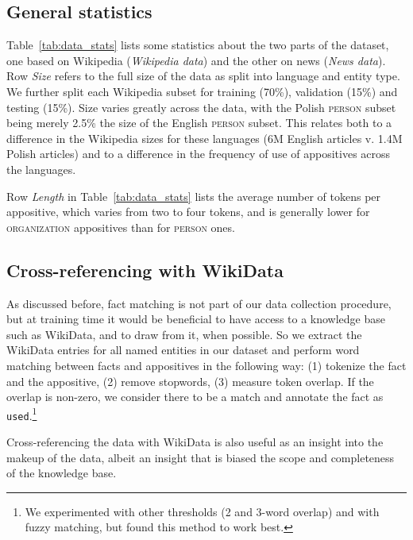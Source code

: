 \documentclass[11pt]{article}
\newcommand{\yktodo}[1]{\todo[color=green!20]{#1}}
\newcommand{\dltodo}[1]{\todo[color=yellow!20]{#1}}
\begin{document}
\subsection{General statistics}
Table~\ref{tab:data_stats} lists some statistics about the two parts of the dataset, one based on Wikipedia (\textit{Wikipedia data}) and the other on news (\textit{News data}). Row \textit{Size} refers to the full size of the data as split into language and entity type. We further split each Wikipedia subset for training (70\%), validation (15\%) and testing (15\%).  
Size varies greatly across the data, with the Polish \textsc{person} subset being merely 2.5\% the size of the English \textsc{person} subset. This relates both to a difference in the Wikipedia sizes for these languages  (6M English articles v. 1.4M Polish articles) and to a difference in the frequency of use of appositives across the languages.  

Row \textit{Length} in Table~\ref{tab:data_stats} lists the average number of tokens per appositive, which varies from two to four tokens, and is generally lower for \textsc{organization} appositives than for \textsc{person} ones. 

\subsection{Cross-referencing with WikiData}

As discussed before, fact matching is not part of our data collection procedure, but at training time it would be beneficial to have access to a knowledge base such as WikiData, and to draw from it, when possible. So we extract the WikiData entries for all named entities in our dataset and perform word matching between facts and appositives in the following way: (1) tokenize the fact and the appositive, (2) remove stopwords, (3) measure token overlap. If the overlap is non-zero, we consider there to be a match and annotate the fact as \texttt{used}.\footnote{We experimented with other thresholds (2 and 3-word overlap) and with fuzzy matching, but found this method to work best.}

Cross-referencing the data with WikiData is also useful as an insight into the makeup of the data, albeit an insight that is biased the scope and completeness of the knowledge base.
\end{document}
